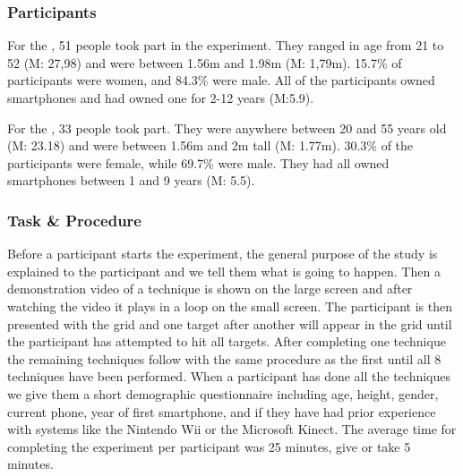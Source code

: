 \subsubsection{Participants}
For the \target, 51 people took part in the experiment. They ranged in age from 21 to 52 (M: 27,98) and were between 1.56m and 1.98m (M: 1,79m). 
15.7\% of participants were women, and 84.3\% were male.
All of the participants owned smartphones and had owned one for 2-12 years (M:5.9).

For the \accuracy, 33 people took part. They were anywhere between 20 and 55 years old (M: 23.18) and were between 1.56m and 2m tall (M: 1.77m).
30.3\% of the participants were female, while 69.7\% were male.
They had all owned smartphones between 1 and 9 years (M: 5.5).

\subsubsection{Task \& Procedure} \label{sec:procedure}
Before a participant starts the experiment, the general purpose of the study is explained to the participant and we tell them what is going to happen.
Then a demonstration video of a technique is shown on the large screen and after watching the video it plays in a loop on the small screen.
The participant is then presented with the grid and one target after another will appear in the grid until the participant has attempted to hit all targets.
After completing one technique the remaining techniques follow with the same procedure as the first until all 8 techniques have been performed.
When a participant has done all the techniques we give them a short demographic questionnaire including age, height, gender, current phone, year of first smartphone, and if they have had prior experience with systems like the Nintendo Wii or the Microsoft Kinect.
The average time for completing the experiment per participant was 25 minutes, give or take 5 minutes. 

